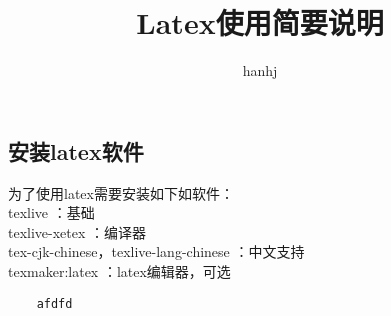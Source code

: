 \documentclass{article}
\begin{document}
\begin{CJK}{UTF8}{gbsn}
\title{Latex使用简要说明}
\author{hanhj}
\maketitle
\section{安装latex软件}
	\par 
	为了使用latex需要安装如下如软件：\\
	texlive									：基础\\
	texlive-xetex							：编译器\\
	tex-cjk-chinese，texlive-lang-chinese	：中文支持\\
	texmaker:latex							：latex编辑器，可选\\
	\begin{lstlisting}	
	afdfd
	\end{lstlisting}
\end{CJK}
\end{document}
